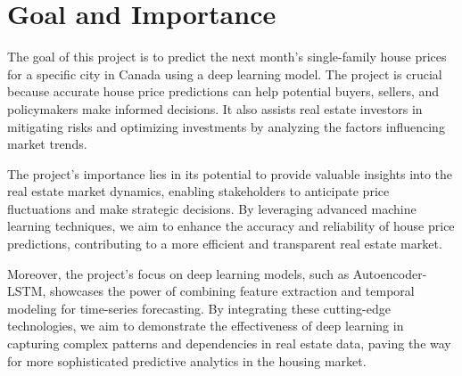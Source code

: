 \section{Goal and Importance}
The goal of this project is to predict the next month's single-family house prices for a specific city in Canada using a deep learning model. The project is crucial because accurate house price predictions can help potential buyers, sellers, and policymakers make informed decisions. It also assists real estate investors in mitigating risks and optimizing investments by analyzing the factors influencing market trends.

The project's importance lies in its potential to provide valuable insights into the real estate market dynamics, enabling stakeholders to anticipate price fluctuations and make strategic decisions. By leveraging advanced machine learning techniques, we aim to enhance the accuracy and reliability of house price predictions, contributing to a more efficient and transparent real estate market.

Moreover, the project's focus on deep learning models, such as Autoencoder-LSTM, showcases the power of combining feature extraction and temporal modeling for time-series forecasting. By integrating these cutting-edge technologies, we aim to demonstrate the effectiveness of deep learning in capturing complex patterns and dependencies in real estate data, paving the way for more sophisticated predictive analytics in the housing market.
